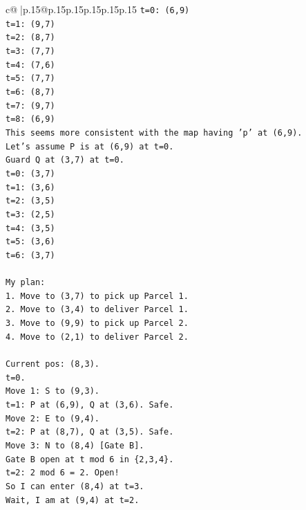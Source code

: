 \documentclass{article}
\begin{document}
{\begin{supertabular}{c@{$\;$}|p{.15\linewidth}@{}p{.15\linewidth}p{.15\linewidth}p{.15\linewidth}p{.15\linewidth}p{.15\linewidth}}
{{{\texttt{t=0: (6,9)} \\
\texttt{t=1: (9,7)} \\
\texttt{t=2: (8,7)} \\
\texttt{t=3: (7,7)} \\
\texttt{t=4: (7,6)} \\
\texttt{t=5: (7,7)} \\
\texttt{t=6: (8,7)} \\
\texttt{t=7: (9,7)} \\
\texttt{t=8: (6,9)} \\
\texttt{This seems more consistent with the map having 'p' at (6,9).} \\
\texttt{Let's assume P is at (6,9) at t=0.} \\
\texttt{Guard Q at (3,7) at t=0.} \\
\texttt{t=0: (3,7)} \\
\texttt{t=1: (3,6)} \\
\texttt{t=2: (3,5)} \\
\texttt{t=3: (2,5)} \\
\texttt{t=4: (3,5)} \\
\texttt{t=5: (3,6)} \\
\texttt{t=6: (3,7)} \\
\\ 
\texttt{My plan:} \\
\texttt{1. Move to (3,7) to pick up Parcel 1.} \\
\texttt{2. Move to (3,4) to deliver Parcel 1.} \\
\texttt{3. Move to (9,9) to pick up Parcel 2.} \\
\texttt{4. Move to (2,1) to deliver Parcel 2.} \\
\\ 
\texttt{Current pos: (8,3).} \\
\texttt{t=0.} \\
\texttt{Move 1: S to (9,3).} \\
\texttt{t=1: P at (6,9), Q at (3,6). Safe.} \\
\texttt{Move 2: E to (9,4).} \\
\texttt{t=2: P at (8,7), Q at (3,5). Safe.} \\
\texttt{Move 3: N to (8,4) {[}Gate B{]}.} \\
\texttt{Gate B open at t mod 6 in \{2,3,4\}.} \\
\texttt{t=2: 2 mod 6 = 2. Open!} \\
\texttt{So I can enter (8,4) at t=3.} \\
\texttt{Wait, I am at (9,4) at t=2.} \\
}}}
\end{supertabular}}
\end{document}
